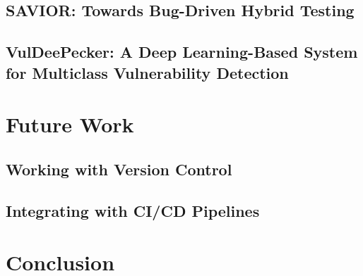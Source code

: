 \documentclass[12pt,twocolumn,letterpaper]{article}
\begin{document}
\subsection{SAVIOR: Towards Bug-Driven Hybrid Testing}
\label{sub:savior}

\cite{Chen20}

\subsection{VulDeePecker: A Deep Learning-Based System for Multiclass Vulnerability Detection}
\label{sub:vuledeepecker}

\cite{Zou21}

\section{Future Work}
\label{sec:future-work}

\subsection{Working with Version Control}
\label{sub:working-with-version-control}

\subsection{Integrating with CI/CD Pipelines}
\label{sub:integrating-with-cicd-pipelines}

\section{Conclusion}
\label{sec:conclusion}

{\small


}
\end{document}
